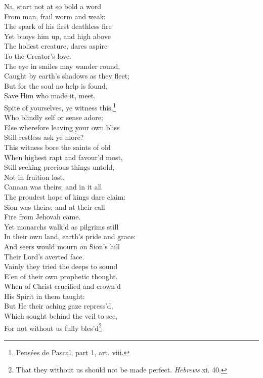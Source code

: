  Na, start not at so bold a word \\
 From man, frail worm and weak: \\
  The spark of his first deathless fire \\
 Yet buoys him up, and high above \\
 The holiest creature, dares aspire \\
 To the Creator’s love. \\
  The eye in smiles may wander round, \\
 Caught by earth’s shadows as they fleet; \\
 But for the soul no help is found, \\
 Save Him who made it, meet. \\
  Spite of yourselves, ye witness this,\footnote{Pensées de Pascal, part 1, art. viii.} \\
 Who blindly self or sense adore; \\
 Else wherefore leaving your own bliss \\
 Still restless ask ye more? \\
  This witness bore the saints of old \\
 When highest rapt and favour’d most, \\
 Still seeking precious things untold, \\
 Not in fruition lost. \\
  Canaan was theirs; and in it all \\
 The proudest hope of kings dare claim: \\
 Sion was theirs; and at their call \\
 Fire from Jehovah came. \\
  Yet monarchs walk’d as pilgrims still \\
 In their own land, earth’s pride and grace: \\
 And seers would mourn on Sion’s hill \\
 Their Lord’s averted face. \\
  Vainly they tried the deeps to sound \\
 E’en of their own prophetic thought, \\
 When of Christ crucified and crown’d \\
 His Spirit in them taught: \\
  But He their aching gaze repress’d, \\
 Which sought behind the veil to see, \\
 For not without us fully bles’d\footnote{That they without us should not be made perfect. \emph{Hebrews} xi. 40.} \\
